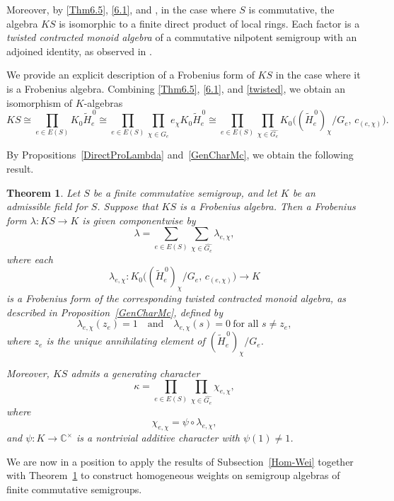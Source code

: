 \documentclass[11pt,reqno]{amsart}
\theoremstyle{plain}
\newtheorem{thm}{Theorem}[section]
\theoremstyle{remark}
\theoremstyle{definition}
\begin{document}
Moreover, by \eqref{Thm6.5}, \eqref{6.1}, and \cite[Proposition~6.9]{Ste-Fac-det}, in the case where $S$ is commutative, the algebra $KS$ is isomorphic to a finite direct product of local rings. 
Each factor is a \emph{twisted contracted monoid algebra} of a commutative nilpotent semigroup with an adjoined identity, as observed in \cite[Remark~6.15]{Ste-Fac-det}.

We provide an explicit description of a Frobenius form of $KS$ in the case where it is a Frobenius algebra.  
Combining \eqref{Thm6.5}, \eqref{6.1}, and \eqref{twisted}, we obtain an isomorphism of $K$-algebras
\begin{equation}\label{isoCS2}
KS 
\cong \prod_{e \in E(S)} K_0 \widetilde{H}_e^{\,0}
\cong \prod_{e \in E(S)} \prod_{\chi \in \widehat{G_e}} e_{\chi} K_0 \widetilde{H}_e^{\,0}
\cong \prod_{e \in E(S)} \prod_{\chi \in \widehat{G_e}} K_0\bigl((\widetilde{H}_e^{\,0})_{\chi}/G_e,\, c_{(e,\chi)}\bigr).
\end{equation}

By Propositions~\ref{DirectProLambda} and~\ref{GenCharMc}, we obtain the following result.

\begin{thm}\label{GenCharS}
Let $S$ be a finite commutative semigroup, and let $K$ be an admissible field  for $S$. Suppose that $KS$ is a Frobenius algebra.  
Then a Frobenius form $\lambda : KS \to K$ is given componentwise by
\[
\lambda
=
\sum_{e \in E(S)} \sum_{\chi \in \widehat{G_e}} \lambda_{e,\chi},
\]
where each
\[
\lambda_{e,\chi} : K_0\bigl((\widetilde{H}_e^{\,0})_{\chi}/G_e,\, c_{(e,\chi)}\bigr) \longrightarrow K
\]
is a Frobenius form of the corresponding twisted contracted monoid algebra, as described in Proposition~\ref{GenCharMc}, defined by
\[
\lambda_{e,\chi}(z_e) = 1 
\quad \text{and} \quad 
\lambda_{e,\chi}(s) = 0 \ \text{for all } s \neq z_e,
\]
where $z_e$ is the unique annihilating element of $(\widetilde{H}_e^{\,0})_{\chi}/G_e$.

Moreover, $KS$ admits a generating character
\[
\kappa
=
\prod_{e \in E(S)} \prod_{\chi \in \widehat{G_e}} \chi_{e,\chi},
\]
where 
\[
\chi_{e,\chi} = \psi \circ \lambda_{e,\chi},
\]
and $\psi : K \to \mathbb{C}^\times$ is a nontrivial additive character with $\psi(1)\neq 1$. 
\end{thm}


We are now in a position to apply the results of Subsection~\ref{Hom-Wei} together with Theorem~\ref{GenCharS} to construct homogeneous weights on semigroup algebras of finite commutative semigroups.
\end{document}
